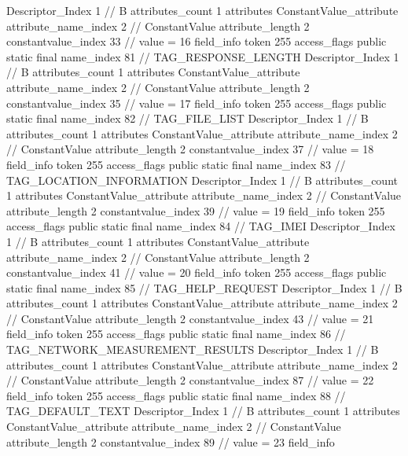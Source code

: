 {{{{{				Descriptor_Index	1		// B
				attributes_count	1
				attributes {
				ConstantValue_attribute {
					attribute_name_index	2		// ConstantValue
					attribute_length	2
					constantvalue_index	33		// value = 16
				}
				}
			}
			field_info {
				token	255
				access_flags	public static final
				name_index	81		// TAG_RESPONSE_LENGTH
				Descriptor_Index	1		// B
				attributes_count	1
				attributes {
				ConstantValue_attribute {
					attribute_name_index	2		// ConstantValue
					attribute_length	2
					constantvalue_index	35		// value = 17
				}
				}
			}
			field_info {
				token	255
				access_flags	public static final
				name_index	82		// TAG_FILE_LIST
				Descriptor_Index	1		// B
				attributes_count	1
				attributes {
				ConstantValue_attribute {
					attribute_name_index	2		// ConstantValue
					attribute_length	2
					constantvalue_index	37		// value = 18
				}
				}
			}
			field_info {
				token	255
				access_flags	public static final
				name_index	83		// TAG_LOCATION_INFORMATION
				Descriptor_Index	1		// B
				attributes_count	1
				attributes {
				ConstantValue_attribute {
					attribute_name_index	2		// ConstantValue
					attribute_length	2
					constantvalue_index	39		// value = 19
				}
				}
			}
			field_info {
				token	255
				access_flags	public static final
				name_index	84		// TAG_IMEI
				Descriptor_Index	1		// B
				attributes_count	1
				attributes {
				ConstantValue_attribute {
					attribute_name_index	2		// ConstantValue
					attribute_length	2
					constantvalue_index	41		// value = 20
				}
				}
			}
			field_info {
				token	255
				access_flags	public static final
				name_index	85		// TAG_HELP_REQUEST
				Descriptor_Index	1		// B
				attributes_count	1
				attributes {
				ConstantValue_attribute {
					attribute_name_index	2		// ConstantValue
					attribute_length	2
					constantvalue_index	43		// value = 21
				}
				}
			}
			field_info {
				token	255
				access_flags	public static final
				name_index	86		// TAG_NETWORK_MEASUREMENT_RESULTS
				Descriptor_Index	1		// B
				attributes_count	1
				attributes {
				ConstantValue_attribute {
					attribute_name_index	2		// ConstantValue
					attribute_length	2
					constantvalue_index	87		// value = 22
				}
				}
			}
			field_info {
				token	255
				access_flags	public static final
				name_index	88		// TAG_DEFAULT_TEXT
				Descriptor_Index	1		// B
				attributes_count	1
				attributes {
				ConstantValue_attribute {
					attribute_name_index	2		// ConstantValue
					attribute_length	2
					constantvalue_index	89		// value = 23
				}
				}
			}
			field_info {
}}}}}
